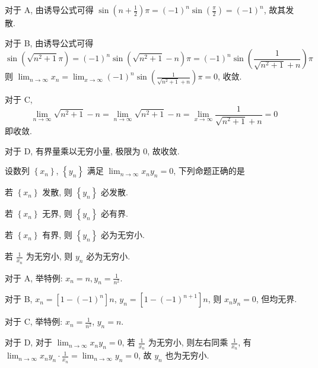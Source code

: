 \begin{analysis}
  对于 A,
  由诱导公式可得 $\sin \left(n+\frac{1}{2}\right) \pi = (-1)^n \sin \left( \frac{\pi}{2} \right) = (-1)^n$,
  故其发散.

  对于 B,
  由诱导公式可得
  \[
    \sin \left( \sqrt{n^{2}+1} \pi\right)
    = (-1)^n \sin \left( \sqrt{n^{2}+1} - n \right) \pi
    = (-1)^n \sin \left( \frac{1}{\sqrt{n^{2}+1} + n } \right) \pi
  \]
  则 $\lim_{n \to \infty} x_n = \lim_{x \to \infty} (-1)^n \sin \left( \frac{1}{\sqrt{n^{2}+1} + n } \right) \pi = 0$,
  收敛.

  对于 C,
  \[
    \lim_{n \to \infty} \sqrt{n^{2}+1}-n
    = \lim_{n \to \infty} \sqrt{n^{2}+1}-n
    = \lim_{x \to \infty} \frac{1}{\sqrt{n^{2}+1}+n}
    = 0
  \]
  即收敛.

  对于 D,
  有界量乘以无穷小量,
  极限为 0,
  故收敛.
\end{analysis}

\begin{question}
  设数列 $\left\{x_{n}\right\}$, $\left\{y_{n}\right\}$ 满足 $\lim_{n  \to \infty} x_{n} y_{n} = 0$,
  下列命题正确的是
  \paren[D]
  \begin{choices}
    \item 若 $\left\{x_{n}\right\}$ 发散,
    则 $\left\{y_{n}\right\}$ 必发散.
    \item 若 $\left\{x_{n}\right\}$ 无界,
    则 $\left\{y_{n}\right\}$ 必有界.
    \item 若 $\left\{x_{n}\right\}$ 有界,
    则 $\left\{y_{n}\right\}$ 必为无穷小.
    \item 若 $\frac{1}{x_{n}}$ 为无穷小,
    则 $y_{n}$ 必为无穷小.
  \end{choices}
\end{question}

\begin{analysis}
  对于 A,
  举特例: $x_n = n, y_n= \frac{1}{n^2}$.

  对于 B, $x_n= \left[1-(-1) ^n \right] n$, $y_n= \left[ 1-(-1) ^{n+1} \right] n$,
  则 $x_ny_n = 0$,
  但均无界.

  对于 C,
  举特例: $x_n= \frac{1}{n^2}$, $y_n = n$.

  对于 D,
  对于 $\lim_{n \to \infty} x_ny_n = 0$,
  若 $\frac{1}{x_n}$ 为无穷小,
  则左右同乘 $\frac{1}{x_n}$,
  有 $\lim_{n \to \infty} x_n y_n\cdot \frac{1}{x_n}= \lim_{n \to \infty} y_n = 0$,
  故 $y_n$ 也为无穷小.
\end{analysis}

